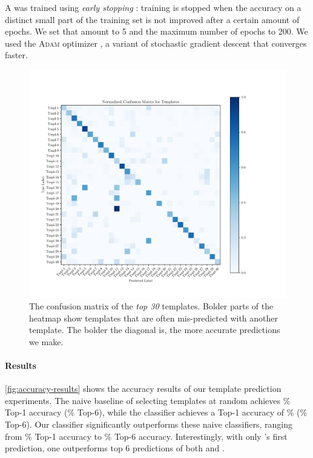 A \dnn was trained using \emph{early stopping} \cite{Hastie2009-bn}:
training is stopped when the accuracy on a distinct small
part of the training set is not improved after a certain amount of epochs. We
set that amount to 5 and the maximum number of epochs to 200. We used the \textsc{Adam}
optimizer \citep{Kingma2014-ng}, a variant of stochastic gradient descent that
converges faster.



\begin{figure}[t]
  \centering
  \includegraphics[trim={30 40 100 70},clip,width=\linewidth]{evaluation-conf-matrix.pdf}
  \caption{The confusion matrix of the \emph{top 30} templates. Bolder parts of
  the heatmap show templates that are often mis-predicted with another template.
  The bolder the diagonal is, the more accurate predictions we make.}
  \label{fig:conf-matrix}
\end{figure}

\paragraph{Results}
\autoref{fig:accuracy-results} shows the accuracy results of our template
prediction experiments. The naive baseline of selecting templates at random
achieves \RandomTopOne\% Top-1 accuracy (\RandomTopSix\% Top-6), while the
\popular classifier achieves a Top-1 accuracy of \PopularTopOne\%
(\PopularTopSix\% Top-6). Our \dnn classifier significantly outperforms these
naive classifiers, ranging from \DnnTopOne\% Top-1 accuracy to \DnnTopSix\%
Top-6 accuracy. Interestingly, with only \dnn's first prediction, one
outperforms top 6 predictions of both \random and \popular.

